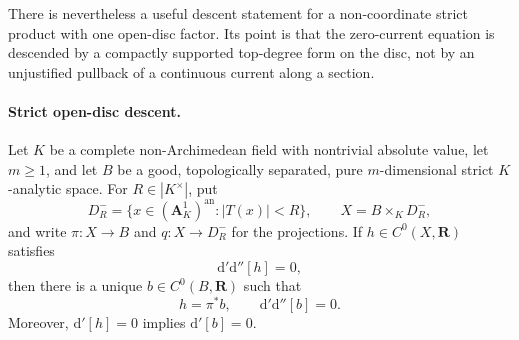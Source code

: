 There is nevertheless a useful descent statement for a non-coordinate
strict product with one open-disc factor.  Its point is that the zero-current
equation is descended by a compactly supported top-degree form on the disc,
not by an unjustified pullback of a continuous current along a section.

\paragraph{Strict open-disc descent.}
\begin{proposition}
\label{prop:p062-open-disc-descent}
Let \(K\) be a complete non-Archimedean field with nontrivial absolute
value, let \(m\geq1\), and let \(B\) be a good, topologically separated,
pure \(m\)-dimensional strict \(K\)-analytic space.  For
\(R\in|K^\times|\), put
\[
 D_R^-=\{x\in(\mathbf A^1_K)^{\mathrm{an}}:|T(x)|<R\},
 \qquad X=B\times_KD_R^-,
\]
and write \(\pi:X\to B\) and \(q:X\to D_R^-\) for the projections.  If
\(h\in C^0(X,\mathbf R)\) satisfies
\[
                         \mathrm d'\mathrm d''[h]=0,
\]
then there is a unique \(b\in C^0(B,\mathbf R)\) such that
\[
                         h=\pi^*b,
                         \qquad
                         \mathrm d'\mathrm d''[b]=0.
\]
Moreover, \(\mathrm d'[h]=0\) implies \(\mathrm d'[b]=0\).
\end{proposition}

